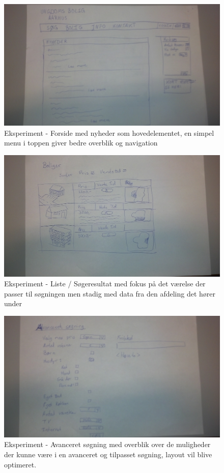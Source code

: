 \documentclass[12pt, a4paper]{report}
\begin{document}
\begin{figure}[ht]
\includegraphics[width=\textwidth]{eksperiment_forside}
\caption{Eksperiment - Forside med nyheder som hovedelementet, en simpel menu i toppen giver bedre overblik og navigation}
\label{e_forside}
\end{figure}

\begin{figure}[ht]
\includegraphics[width=\textwidth]{eksperiment_liste}
\caption{Eksperiment - Liste / Søgeresultat med fokus på det værelse der passer til søgningen men stadig med data fra den afdeling det hører under}
\label{e_liste}
\end{figure}

\begin{figure}[ht]
\includegraphics[width=\textwidth]{eksperiment_soeg}
\caption{Eksperiment - Avanceret søgning med overblik over de muligheder der kunne være i en avanceret og tilpasset søgning, layout vil blive optimeret.}
\label{e_soeg}
\end{figure}
\end{document}
